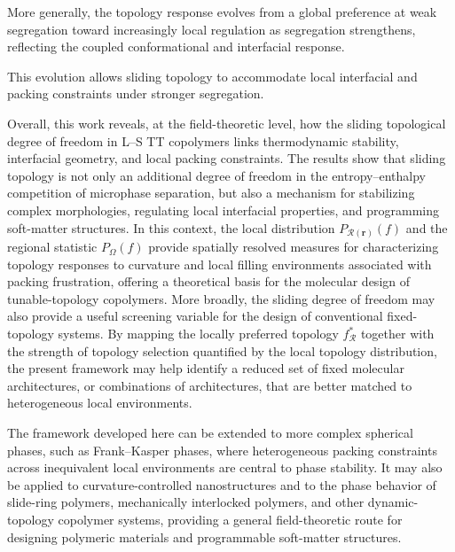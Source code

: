 More generally, the topology response evolves from a global preference at weak segregation toward increasingly local regulation as segregation strengthens, reflecting the coupled conformational and interfacial response.

This evolution allows sliding topology to accommodate local interfacial and packing constraints under stronger segregation.


Overall, this work reveals, at the field-theoretic level, how the sliding topological degree of freedom in L--S TT copolymers links thermodynamic stability, interfacial geometry, and local packing constraints.
The results show that sliding topology is not only an additional degree of freedom in the entropy--enthalpy competition of microphase separation, but also a mechanism for stabilizing complex morphologies, regulating local interfacial properties, and programming soft-matter structures.
In this context, the local distribution $P_{\mathcal R(\bm r)}(f)$ and the regional statistic $P_{\Omega}(f)$ provide spatially resolved measures for characterizing topology responses to curvature and local filling environments associated with packing frustration, offering a theoretical basis for the molecular design of tunable-topology copolymers. 
More broadly, the sliding degree of freedom may also provide a useful screening variable for the design of conventional fixed-topology systems.
By mapping the locally preferred topology $f_{\mathcal R}^{\ast}$ together with the strength of topology selection quantified by the local topology distribution, the present framework may help identify a reduced set of fixed molecular architectures, or combinations of architectures, that are better matched to heterogeneous local environments.

The framework developed here can be extended to more complex spherical phases, such as Frank--Kasper phases, where heterogeneous packing constraints across inequivalent local environments are central to phase stability.
It may also be applied to curvature-controlled nanostructures and to the phase behavior of slide-ring polymers, mechanically interlocked polymers, and other dynamic-topology copolymer systems, providing a general field-theoretic route for designing polymeric materials and programmable soft-matter structures.
